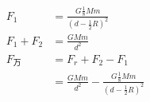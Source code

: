 
\begin{align*}
F_1&=\frac{G\frac{1}{8}Mm}{\left(d-\frac{1}{2}R\right)^2}\\
F_1+F_2&=\frac{GMm}{d^2}\\
F_{\text{万}}&=F_r+F_2-F_1 \\
&=\frac{GMm}{d^2}-\frac{G\frac{1}{8}Mm}{\left(d-\frac{1}{2}R\right)^2}
\end{align*}%
